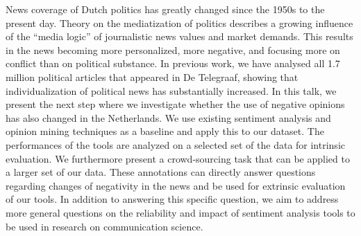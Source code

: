 \documentclass[10pt, a4paper, twopage, headinclude, footinclude, BCOR5mm]{book}
\begin{document}
\begin{table}[t!]
\end{table} 
\begin{table}[t!]
\end{table} 
\noindent
News coverage of Dutch politics has greatly changed since the 1950s to the present day. Theory on the mediatization of politics describes a growing influence of the “media logic” of journalistic news values and market demands. This results in the news becoming more personalized, more negative, and focusing more on conflict than on political substance.  In previous work, we have analysed all 1.7 million political articles that appeared in De Telegraaf, showing that individualization of political news has substantially increased. In this talk, we present the next step where we investigate whether the use of negative opinions has also changed in the Netherlands.  We use existing sentiment analysis and opinion mining techniques as a baseline and apply this to our dataset. The performances of the tools are analyzed on a selected set of the data for intrinsic evaluation. We furthermore present a crowd-sourcing task that can be applied to a larger set of our data. These annotations can directly answer questions regarding changes of negativity in the news and be used for extrinsic evaluation of our tools. In addition to answering this specific question, we aim to address more general questions on the reliability and impact of sentiment analysis tools to be used in research on communication science.  
\end{document}
